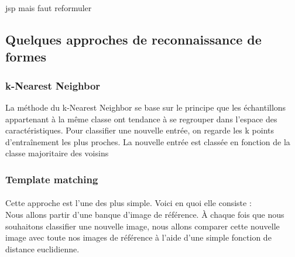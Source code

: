 \documentclass[a4paper]{article}
\begin{document}
			jsp mais faut reformuler
		\subsection{Quelques approches de reconnaissance de formes}
			\subsubsection{k-Nearest Neighbor}
				La méthode du k-Nearest Neighbor se base sur le principe que les échantillons appartenant à la même classe ont tendance à se regrouper dans l'espace des caractéristiques.
				Pour classifier une nouvelle entrée, on regarde les k points d'entraînement les plus proches. La nouvelle entrée est classée en fonction de la classe majoritaire des voisins
			\subsubsection{Template matching} 
				\paragraph{}
					Cette approche est l'une des plus simple. Voici en quoi elle consiste :\\Nous allons partir d'une banque d'image de référence. À chaque fois que nous souhaitons classifier une nouvelle image, nous allons comparer cette nouvelle image avec toute nos images de référence à l'aide d'une simple fonction de distance euclidienne.
\end{document}
